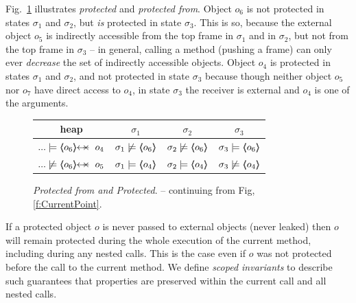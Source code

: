  
Fig.\ \ref{fig:ProtectedBoth} illustrates \emph{protected} and \emph{protected
from}. Object $o_6$ is not protected in states $\sigma_1$ and
$\sigma_2$, but \emph{is} protected in state $\sigma_3$.
This is so, because the external object $o_5$ is indirectly accessible from the top frame in $\sigma_1$ and in  $\sigma_2$, but not
from the top frame in $\sigma_3$ --
in general, calling a method (pushing a frame) can only ever \emph{decrease} the set of indirectly accessible objects. 
Object $o_4$  is  protected in  states $\sigma_1$ and  $\sigma_2$,  and not  protected in state $\sigma_3$
because though neither object $o_5$ nor $o_7$ have direct access to $o_4$, in state $\sigma_3$ the receiver is external and $o_4$ is one of the arguments.

 
\begin{figure}[htb]
\begin{tabular}{|c|c|c|c|}
\hline
 heap
&
$\sigma_1$  %
&
$\sigma_2$ 
&
$\sigma_3$ 
\\
\hline 
$... \models \protectedFrom {o_6} {o_4}$
&
$\sigma_1   \not\models \langle\!\!\langle o_6 \rangle\!\!\rangle$
&
$\sigma_2   \not\models \langle\!\!\langle o_6 \rangle\!\!\rangle$
&
$\sigma_3 \models \langle\!\!\langle o_6 \rangle\!\!\rangle$
\\
$... \not\models  \protectedFrom {o_6} {o_5}$
&
$\sigma_1  \models \langle\!\!\langle o_4 \rangle\!\!\rangle$
&
$\sigma_2 \models \langle\!\!\langle o_4 \rangle\!\!\rangle$
&
$\sigma_3 \not \models \langle\!\!\langle o_4 \rangle\!\!\rangle$
\\
\hline %
\end{tabular}
\caption{\textit{Protected from and Protected}. -- continuing from Fig, \ref{f:CurrentPoint}.
 }
   \label{fig:ProtectedBoth}
 \end{figure}

If a protected object $o$ is never passed to external objects (\ie never leaked)  then $o$ will remain protected during the whole execution of the current method,
including during any nested calls.
This is the case even if $o$ was not protected before the call to the current method.
We define  \emph{scoped invariants} to  describe such  guarantees that properties are preserved within the current call and all nested calls.





